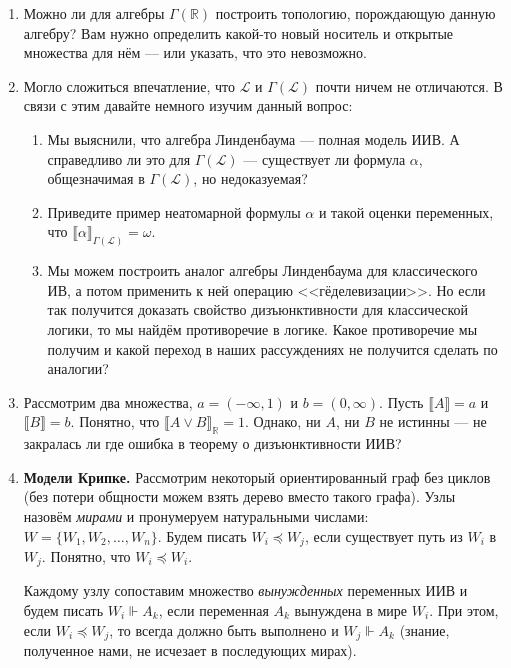 \documentclass[10pt,a4paper,oneside]{article}
\begin{document}
\begin{enumerate}
\item Можно ли для алгебры $\Gamma(\mathbb{R})$ построить топологию, порождающую данную
алгебру? Вам нужно определить какой-то новый носитель и открытые множества для нём --- или указать,
что это невозможно.

\item Могло сложиться впечатление, что $\mathscr{L}$ и $\Gamma(\mathscr{L})$ почти ничем не отличаются.
В связи с этим давайте немного изучим данный вопрос:

\begin{enumerate}
\item Мы выяснили, что алгебра Линденбаума --- полная модель ИИВ. 
А справедливо ли это для $\Gamma(\mathscr{L})$ --- существует ли формула $\alpha$,
общезначимая в $\Gamma(\mathscr{L})$, но недоказуемая?
\item Приведите пример неатомарной формулы $\alpha$ и такой оценки переменных, что 
$\llbracket\alpha\rrbracket_{\Gamma(\mathscr{L})} = \omega$. 
\item Мы можем построить аналог алгебры Линденбаума для классического ИВ, а потом применить к ней
операцию <<гёделевизации>>. Но если так получится доказать свойство дизъюнктивности для классической логики,
то мы найдём противоречие в логике. Какое противоречие мы получим и какой переход в наших рассуждениях 
не получится сделать по аналогии?
\end{enumerate}

\item Рассмотрим два множества, $a = (-\infty,1)$ и $b = (0,\infty)$. 
Пусть $\llbracket A \rrbracket = a$ и $\llbracket B \rrbracket = b$. Понятно, что 
$\llbracket A \vee B \rrbracket_\mathbb{R} = 1$. 
Однако, ни $A$, ни $B$ не истинны --- не закралась ли где ошибка в теорему о 
дизъюнктивности ИИВ? 

\item {\bfseries Модели Крипке.} Рассмотрим некоторый ориентированный граф без циклов (без потери общности можем
взять дерево вместо такого графа). Узлы назовём \emph{мирами} и пронумеруем натуральными
числами: $W = \{ W_1, W_2, \dots, W_n\}$. Будем писать $W_i \preceq W_j$, если существует путь
из $W_i$ в $W_j$. Понятно, что $W_i \preceq W_i$.

Каждому узлу сопоставим множество \emph{вынужденных} переменных ИИВ и будем писать 
$W_i \Vdash A_k$, если переменная $A_k$ вынуждена в мире $W_i$. При этом, если $W_i \preceq W_j$,
то всегда должно быть выполнено и $W_j \Vdash A_k$ (знание, полученное нами, не исчезает
в последующих мирах).


\end{enumerate}
\end{document}
